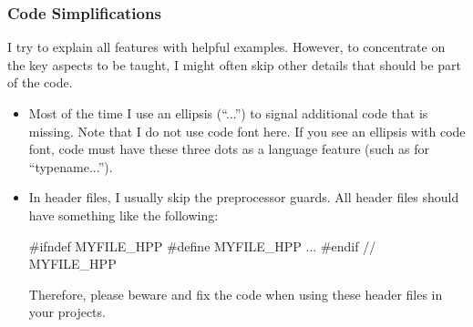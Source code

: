 \subsubsection*{ Code Simplifications}

I try to explain all features with helpful examples. However, to concentrate on the key aspects to be taught, I might often skip other details that should be part of the code.

\begin{itemize}
\item
Most of the time I use an ellipsis (“...”) to signal additional code that is missing. Note that I do not use code font here. If you see an ellipsis with code font, code must have these three dots as a language feature (such as for “typename...”).

\item
In header files, I usually skip the preprocessor guards. All header files should have something like the following:

\begin{cpp}
#ifndef MYFILE_HPP
#define MYFILE_HPP
...
#endif // MYFILE_HPP
\end{cpp}

Therefore, please beware and fix the code when using these header files in your projects.
\end{itemize}
